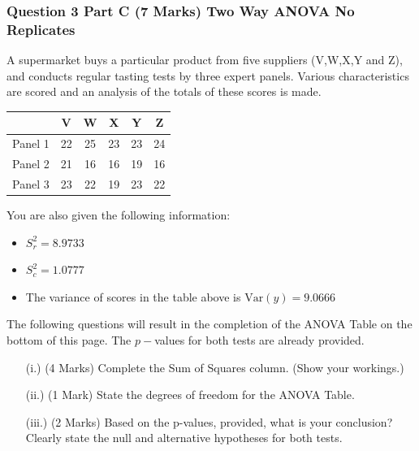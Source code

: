 \documentclass[a4paper,12pt]{article}
\begin{document}
	\subsubsection*{Question 3 Part C (7 Marks) Two Way ANOVA No Replicates}
	\noindent A supermarket buys a particular product from five suppliers (V,W,X,Y and Z), and conducts regular tasting tests by three expert panels.
	Various characteristics are scored and an analysis of the totals of these scores is made. 
	
	\begin{center}
		\begin{tabular}{|c|c|c|c|c|c|}\hline 
			&	V  & W  & X & Y & Z \\ \hline
			\hline  
			
			Panel 1&   22 &  25 &  23 &  23 &  24 \\ \hline
			Panel 2&   21 &  16 &  16 &  19 &  16 \\ \hline
			Panel 3&   23 &  22 &  19 &  23 &  22 \\ \hline
			
			\hline 
		\end{tabular} 
	\end{center}
	
	\noindent You are also given the following information:
	\begin{itemize}
		\item $S^2_r = 8.9733$
		\item $S^2_c = 1.0777$
		\item The variance of scores in the table above is $\mbox{Var}(y) = 9.0666$
	\end{itemize}
	\bigskip 
	\noindent The following questions will result in the completion of the ANOVA Table on the bottom of this page. The $p-$values for both tests are already provided.
	\begin{itemize}
		\item[(i.)](4 Marks) Complete the Sum of Squares column. (Show your workings.)
		\item[(ii.)] (1 Mark) State the degrees of freedom for the ANOVA Table.
		\item[(iii.)] (2 Marks) Based on the p-values, provided, what is your conclusion? Clearly state the null and alternative hypotheses for both tests.
	\end{itemize}
	
\end{document}
